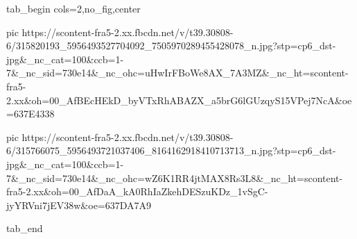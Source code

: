  
 
 
 
 


\ifcmt
  tab_begin cols=2,no_fig,center

     pic https://scontent-fra5-2.xx.fbcdn.net/v/t39.30808-6/315820193_5956493527704092_7505970289455428078_n.jpg?stp=cp6_dst-jpg&_nc_cat=100&ccb=1-7&_nc_sid=730e14&_nc_ohc=uHwIrFBoWe8AX_7A3MZ&_nc_ht=scontent-fra5-2.xx&oh=00_AfBEcHEkD_byVTxRhABAZX_a5brG6lGUzqyS15VPej7NcA&oe=637E4338

     pic https://scontent-fra5-2.xx.fbcdn.net/v/t39.30808-6/315766075_5956493721037406_8164162918410713713_n.jpg?stp=cp6_dst-jpg&_nc_cat=100&ccb=1-7&_nc_sid=730e14&_nc_ohc=wZ6K1RR4jtMAX8Rs3L8&_nc_ht=scontent-fra5-2.xx&oh=00_AfDaA_kA0RhIaZkehDESzuKDz_1vSgC-jyYRVni7jEV38w&oe=637DA7A9

  tab_end
\fi
